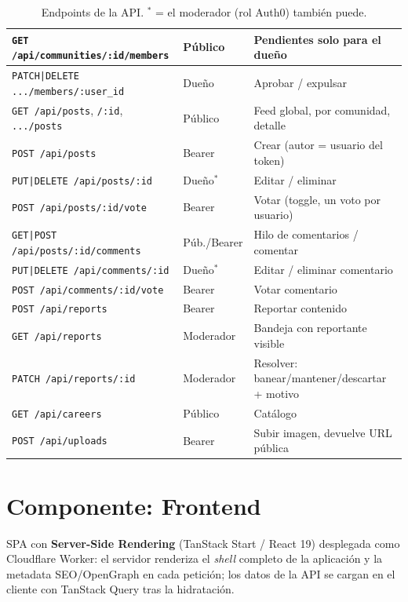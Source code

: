 \documentclass{article}
\begin{document}
\begin{table}[H]
{\begin{tabular}{|p{6.9cm}|p{2.1cm}|p{5.4cm}|}
    \texttt{GET /api/communities/:id/members} & Público & Pendientes solo para el dueño \\
    \hline
    \texttt{PATCH|DELETE .../members/:user\_id} & Dueño & Aprobar / expulsar \\
    \hline
    \texttt{GET /api/posts}, \texttt{/:id}, \texttt{.../posts} & Público & Feed global, por comunidad, detalle \\
    \hline
    \texttt{POST /api/posts} & Bearer & Crear (autor = usuario del token) \\
    \hline
    \texttt{PUT|DELETE /api/posts/:id} & Dueño$^{*}$ & Editar / eliminar \\
    \hline
    \texttt{POST /api/posts/:id/vote} & Bearer & Votar (toggle, un voto por usuario) \\
    \hline
    \texttt{GET|POST /api/posts/:id/comments} & Púb./Bearer & Hilo de comentarios / comentar \\
    \hline
    \texttt{PUT|DELETE /api/comments/:id} & Dueño$^{*}$ & Editar / eliminar comentario \\
    \hline
    \texttt{POST /api/comments/:id/vote} & Bearer & Votar comentario \\
    \hline
    \texttt{POST /api/reports} & Bearer & Reportar contenido \\
    \hline
    \texttt{GET /api/reports} & Moderador & Bandeja con reportante visible \\
    \hline
    \texttt{PATCH /api/reports/:id} & Moderador & Resolver: banear/mantener/descartar + motivo \\
    \hline
    \texttt{GET /api/careers} & Público & Catálogo \\
    \hline
    \texttt{POST /api/uploads} & Bearer & Subir imagen, devuelve URL pública \\
    \hline
\end{tabular}}
\caption{Endpoints de la API. $^{*}$ = el moderador (rol Auth0) también puede.}
\end{table}

\section{Componente: Frontend}

SPA con \textbf{Server-Side Rendering} (TanStack Start / React 19) desplegada
como Cloudflare Worker: el servidor renderiza el \textit{shell} completo de la
aplicación y la metadata SEO/OpenGraph en cada petición; los datos de la API
se cargan en el cliente con TanStack Query tras la hidratación.
\end{document}

